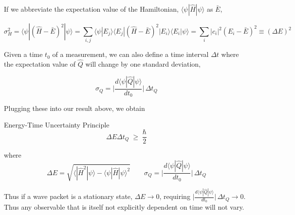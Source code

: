 If we abbreviate the expectation value of the Hamiltonian, $\langle \psi
| \hat{H} | \psi \rangle$ as $\bar{E}$, 

\[
  \sigma_H^2 = \langle \psi | (\hat{H} - \bar{E})^2 | \psi \rangle
  = \sum_{i,j}^{} \langle \psi | E_j \rangle \langle E_j | (\hat{H}
  - \bar{E})^2 | E_i \rangle \langle E_i | \psi \rangle = \sum_{i}^{} |c_i|^2
  (E_i - \bar{E})^2 \equiv (\Delta E)^2
\] \vspace{3px}

Given a time $t_0$ of a measurement, we can also define a time interval $\Delta
t$ where the expectation value of $\hat{Q}$ will change by one standard
deviation, 

\[
\sigma_Q = \Bigg| \frac{d \langle \psi | \hat{Q} | \psi \rangle}{d t_0}\Bigg| \,
\Delta t_Q
\] \vspace{3px}

Plugging these into our result above, we obtain 

\begin{mainbox}{Energy-Time Uncertainty Principle}
  \[
  \Delta E \Delta t_Q \; \geq \; \frac{\hbar}{2}
  \] \vspace{3px}
  
  where \[ \Delta E = \sqrt{\langle | \hat{H}^2 | \psi \rangle - \langle \psi
  | \hat{H} | \psi \rangle^2} \qquad \sigma_Q = \Bigg| \frac{d \langle \psi
| \hat{Q}| \psi \rangle}{d t_0} \Bigg|\, \Delta t_Q \]
\end{mainbox}




Thus if a wave packet is a stationary state, $\Delta E \rightarrow 0$,
requiring $\Big| \frac{d \langle \psi | \hat{Q} | \psi \rangle}{d t_0} \Big|
\, \Delta t_Q \rightarrow 0$. Thus any observable that is itself not explicitly
dependent on time will not vary. 





















